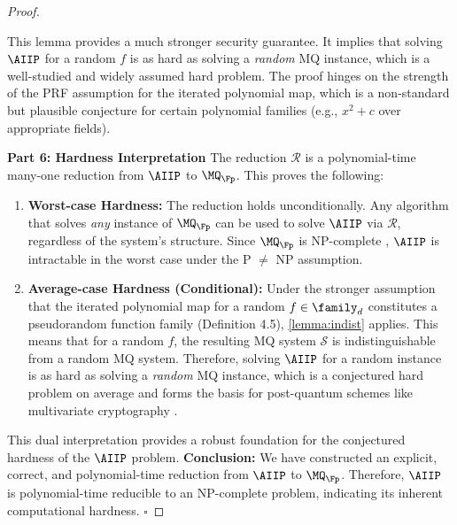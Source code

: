 \begin{proof}
\begin{remark}
                    This lemma provides a much stronger security guarantee. It implies that solving $\AIIP$ for a random $f$ is as hard as solving a \textit{random} MQ instance, which is a well-studied and widely assumed hard problem. The proof hinges on the strength of the PRF assumption for the iterated polynomial map, which is a non-standard but plausible conjecture for certain polynomial families (e.g., $x^2 + c$ over appropriate fields).
                \end{remark}
            \textbf{Part 6: Hardness Interpretation}
                The reduction $\mathcal{R}$ is a polynomial-time many-one reduction from $\AIIP$ to $\MQ_{\Fp}$. This proves the following:
                \begin{enumerate}
                    \item \textbf{Worst-case Hardness:} The reduction holds unconditionally. Any algorithm that solves \textit{any} instance of $\MQ_{\Fp}$ can be used to solve $\AIIP$ via $\mathcal{R}$, regardless of the system's structure. Since $\MQ_{\Fp}$ is NP-complete \cite{Patarin1996, Garey1979}, $\AIIP$ is intractable in the worst case under the P $\neq$ NP assumption.
                    \item \textbf{Average-case Hardness (Conditional):} Under the stronger assumption that the iterated polynomial map for a random $f \in \family_d$ constitutes a pseudorandom function family (Definition 4.5), \cref{lemma:indist} applies. This means that for a random $f$, the resulting MQ system $\mathcal{S}$ is indistinguishable from a random MQ system. Therefore, solving $\AIIP$ for a random instance is as hard as solving a \textit{random} MQ instance, which is a conjectured hard problem on average and forms the basis for post-quantum schemes like multivariate cryptography \cite{Patarin1996}.
                \end{enumerate}
                \noindent This dual interpretation provides a robust foundation for the conjectured hardness of the $\AIIP$ problem.
                \textbf{Conclusion:} We have constructed an explicit, correct, and polynomial-time reduction from $\AIIP$ to $\MQ_{\Fp}$. Therefore, $\AIIP$ is polynomial-time reducible to an NP-complete problem, indicating its inherent computational hardness. $\square$
        \end{proof}
